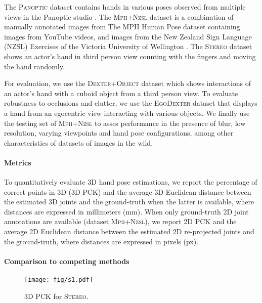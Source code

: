 \documentclass[10pt,twocolumn,letterpaper]{article}
\begin{document}
The \textsc{Panoptic} dataset \cite{simon2017hand} contains hands in various poses observed from multiple views in the Panoptic studio \cite{joo2015panoptic}. The \textsc{Mpii+Nzsl} dataset \cite{simon2017hand} is a combination of manually annotated images from The MPII Human Pose dataset \cite{andriluka20142d} containing images from YouTube videos, and images from the New Zealand Sign Language (NZSL) Exercises of the Victoria University of Wellington \cite{NZSL}. The \textsc{Stereo} dataset \cite{zhang20163d} shows an actor's hand in third person view counting with the fingers and moving the hand randomly.

For evaluation, we use the \textsc{Dexter+Object} dataset \cite{RealtimeHO_ECCV2016} which shows interactions of an actor's hand with a cuboid object from a third person view. To evaluate robustness to occlusions and clutter, we use the \textsc{EgoDexter} dataset \cite{OccludedHands_ICCV2017} that displays a hand from an egocentric view interacting with various objects. We finally use the testing set of \textsc{Mpii+Nzsl} \cite{simon2017hand} to asses performance in the presence of blur, low resolution, varying viewpoints and hand pose configurations, among other characteristics of datasets of images in the wild. 

\paragraph{Metrics}
\vspace{-10pt}
To quantitatively evaluate 3D hand pose estimations, we report the percentage of correct points in 3D (3D PCK) and the average 3D Euclidean distance between the estimated 3D joints and the ground-truth when the latter is available, where distances are expressed in millimeters (mm). When only ground-truth 2D joint annotations are available (dataset \textsc{Mpii+Nzsl}), we report 2D PCK and the average 2D Euclidean distance between the estimated 2D re-projected joints and the ground-truth, where distances are expressed in pixels (px).  

\paragraph{Comparison to competing methods}
\vspace{-10pt}

\begin{figure}[h!]
\center
\texttt{[image: fig/s1.pdf]}
\vspace{-8pt}
\caption{3D PCK for \textsc{Stereo}.}
\label{fig:pck_s1}
\end{figure}
\end{document}
